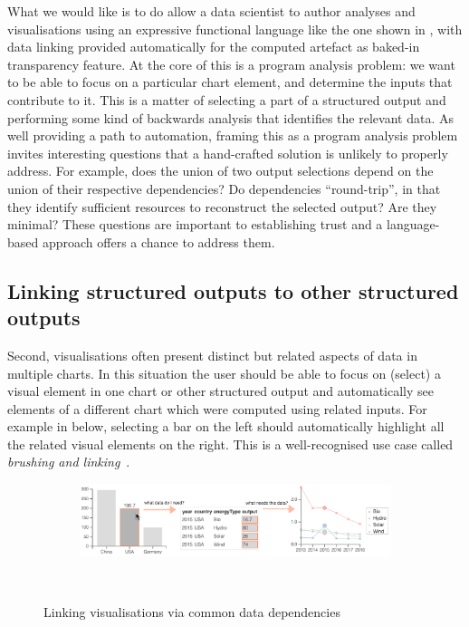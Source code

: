 What we would like is to do allow a data scientist to author analyses and visualisations using an expressive functional language like the one shown in , with data linking provided automatically for the computed artefact as baked-in transparency feature. At the core of this is a program analysis problem: we want to be able to focus on a particular chart element, and determine the inputs that contribute to it. This is a matter of selecting a part of a structured output and performing some kind of backwards analysis that identifies the relevant data. As well providing a path to automation, framing this as a program analysis problem invites interesting questions that a hand-crafted solution is unlikely to properly address. For example, does the union of two output selections depend on the union of their respective dependencies? Do dependencies ``round-trip'', in that they identify sufficient resources to reconstruct the selected output? Are they minimal? These questions are important to establishing trust and a language-based approach offers a chance to address them.

\subsection{Linking structured outputs to other structured outputs}
\label{sec:introduction:vis-linking}
Second, visualisations often present distinct but related aspects of data in multiple charts. In this situation the user should be able to focus on (select) a visual element in one chart or other structured output and automatically see elements of a different chart which were computed using related inputs. For example in  below, selecting a bar on the left should automatically highlight all the related visual elements on the right. This is a well-recognised use case called \emph{brushing and linking}~\cite{becker87}.

\begin{figure}
  \begin{subfigure}[b]{0.99\textwidth}
     \centering
     {\includegraphics[scale=0.58]{fig/example/vis-linking.png}}
  \end{subfigure}\\[2mm]
  \begin{subfigure}{0.8\textwidth}
     \small
     
  \end{subfigure}
 \caption{Linking visualisations via common data dependencies}
 \label{fig:introduction:vis-linking}
\end{figure}

